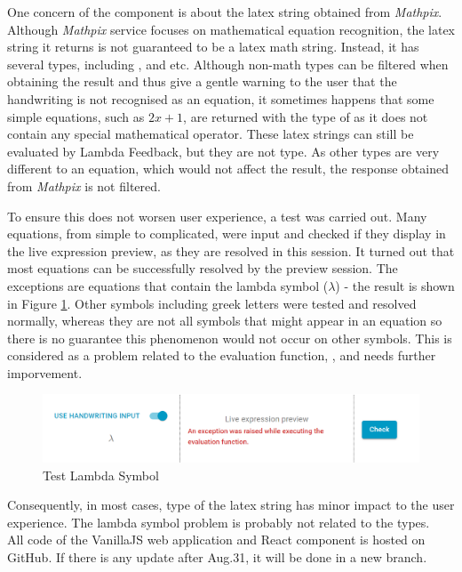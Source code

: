 \documentclass[12pt,twoside]{report}
\begin{document}
One concern of the component is about the latex string obtained from
\textit{Mathpix}. Although \textit{Mathpix} service focuses on mathematical
equation recognition, the latex string it returns is not guaranteed to be a
latex math string. Instead, it has several types, including ,
 and  etc. Although non-math types can be filtered when
obtaining the result and thus give a gentle warning to the user that the
handwriting is not recognised as an equation, it sometimes happens that some simple equations, such as $2x+1$, are returned with the type of  as it does not contain any special mathematical operator. These latex strings can still be evaluated by Lambda Feedback, but they are not  type. As other types are very different to an equation, which would not affect the result, the response obtained from \textit{Mathpix} is not filtered.

To ensure this does not worsen user experience, a test was carried out. Many
equations, from simple to complicated, were input and checked if they display in
the live expression preview, as they are resolved in this session. It turned out
that most equations can be successfully resolved by the preview session. The
exceptions are equations that contain the lambda symbol ($\lambda$) - the result
is shown in Figure \ref{fig:test-lambda}. Other symbols including greek letters
were tested and resolved normally, whereas they are not all symbols that might
appear in an equation so there is no guarantee this phenomenon would not occur
on other symbols. This is considered as a problem related to the evaluation function,
, and needs further imporvement.
\begin{figure}
    \centering
    \includegraphics[width=\linewidth, frame]{figures/test-lambda.png}
    \caption{Test Lambda Symbol}
    \label{fig:test-lambda}
\end{figure}

Consequently, in most cases, type of the latex string has minor impact to the user
experience. The lambda symbol problem is probably not related to the types.
\\

All code of the VanillaJS web application and React component is hosted on GitHub. If there is any update after Aug.31, it will be done in a new branch.
\end{document}
